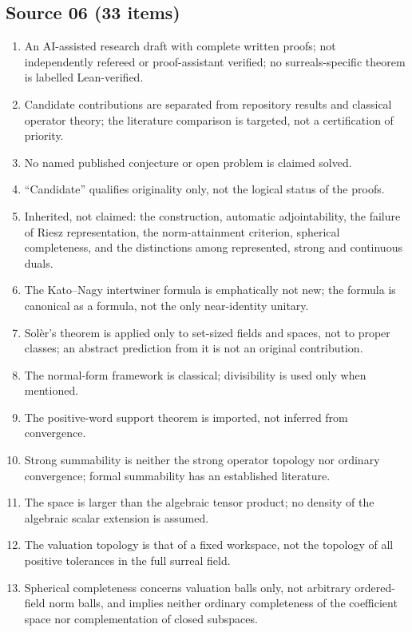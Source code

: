 \documentclass[11pt,letterpaper]{article}
\numberwithin{equation}{section}
\theoremstyle{definition}
\theoremstyle{remark}
\begin{document}
\subsection{Source 06 (33 items)}
\begin{enumerate}[leftmargin=*,widest=00,label=06.\arabic*]
\item An AI-assisted research draft with complete written proofs; not
independently refereed or proof-assistant verified; no surreals-specific
theorem is labelled Lean-verified.
\item Candidate contributions are separated from repository results and
classical operator theory; the literature comparison is targeted, not a
certification of priority.
\item No named published conjecture or open problem is claimed solved.
\item ``Candidate'' qualifies originality only, not the logical status of the
proofs.
\item Inherited, not claimed: the construction, automatic adjointability,
the failure of Riesz representation, the norm-attainment criterion,
spherical completeness, and the distinctions among represented, strong and
continuous duals.
\item The Kato--Nagy intertwiner formula is emphatically not new; the formula
is canonical as a formula, not the only near-identity unitary.
\item Sol\`er's theorem is applied only to set-sized fields and spaces, not to
proper classes; an abstract prediction from it is not an original
contribution.
\item The normal-form framework is classical; divisibility is used only when
mentioned.
\item The positive-word support theorem is imported, not inferred from
convergence.
\item Strong summability is neither the strong operator topology nor ordinary
convergence; formal summability has an established literature.
\item The space is larger than the algebraic tensor product; no density of
the algebraic scalar extension is assumed.
\item The valuation topology is that of a fixed workspace, not the topology
of all positive tolerances in the full surreal field.
\item Spherical completeness concerns valuation balls only, not arbitrary
ordered-field norm balls, and implies neither ordinary completeness of the
coefficient space nor complementation of closed subspaces.

\end{enumerate}
\end{document}

